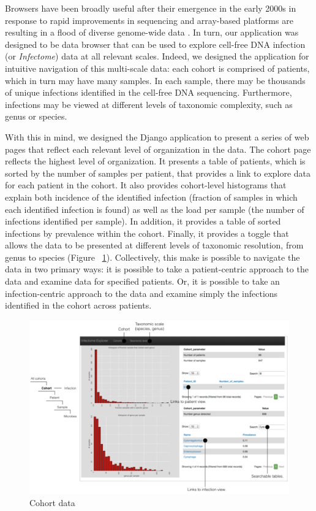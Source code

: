 Browsers have been broadly useful after their emergence in the early 2000s in response to rapid improvements in sequencing and array-based platforms are resulting in a flood of diverse genome-wide data \cite{ODonoghue:2010bd}. In turn, our application was designed to be data browser that can be used to explore cell-free DNA infection (or \emph{Infectome}) data at all relevant scales. Indeed, we designed the application for intuitive navigation of this multi-scale data: each cohort is comprised of patients, which in turn may have many samples. In each sample, there may be thousands of unique infections identified in the cell-free DNA sequencing. Furthermore, infections may be viewed at different levels of taxonomic complexity, such as genus or species. 

With this in mind, we designed the Django application to present a series of web pages that reflect each relevant level of organization in the data. The cohort page reflects  the highest level of organization. It presents a table of patients, which is sorted by the number of samples per patient, that provides a link to explore data for each patient in the cohort. It also provides cohort-level histograms that explain both incidence of the identified infection (fraction of samples in which each identified infection is found) as well as the load per sample (the number of infections identified per sample). In addition, it provides a table of sorted infections by prevalence within the cohort. Finally, it provides a toggle that allows the data to be presented at different levels of taxonomic resolution, from genus to species (Figure ~\ref{fig:Fig5}). Collectively, this make is possible to navigate the data in two primary ways: it is possible to take a patient-centric approach to the data and examine data for specified patients. Or, it is possible to take an infection-centric approach to the data and examine simply the infections identified in the cohort across patients. 

\begin{figure}
\center\includegraphics[width=150mm,scale=0.5]{Figures/Fig5}
\caption{Cohort data}
\label{fig:Fig5}
\end{figure}

